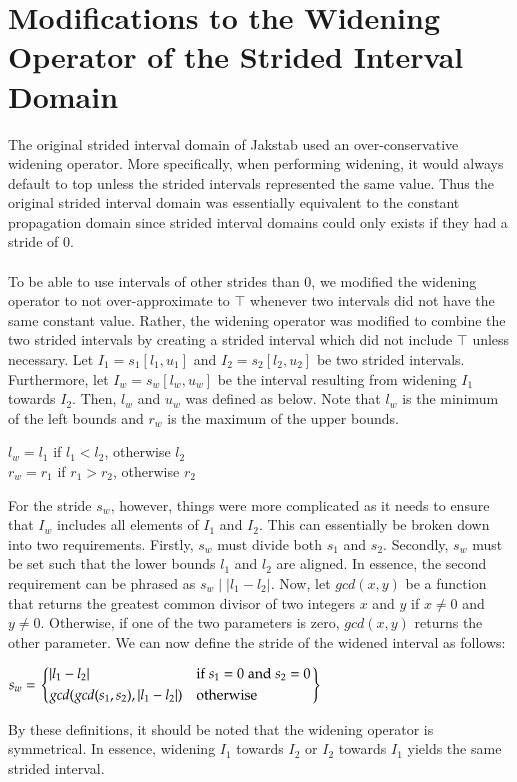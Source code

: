 \documentclass{kththesis}
\begin{document}
\section{Modifications to the Widening Operator of the Strided Interval Domain}
The original strided interval domain of Jakstab used an over-conservative widening operator. More specifically, when performing widening, it would always default to top unless the strided intervals represented the same value. Thus the original strided interval domain was essentially equivalent to the constant propagation domain since strided interval domains could only exists if they had a stride of $0$.
\\ \\
To be able to use intervals of other strides than $0$, we modified the widening operator to not over-approximate to $\top$ whenever two intervals did not have the same constant value. Rather, the widening operator was modified to combine the two strided intervals by creating a strided interval which did not include $\top$ unless necessary. Let $I_1=s_1[l_1,u_1]$ and $I_2=s_2[l_2,u_2]$ be two strided intervals. Furthermore, let $I_w=s_w[l_w,u_w]$ be the interval resulting from widening $I_1$ towards $I_2$. Then, $l_w$ and $u_w$ was defined as below. Note that $l_w$ is the minimum of the left bounds and $r_w$ is the maximum of the upper bounds.
\begin{center}
$l_w = l_1$ if $l_1 < l_2$, otherwise $l_2$\\
$r_w = r_1$ if $r_1 > r_2$, otherwise $r_2$
\end{center}
For the stride $s_w$, however, things were more complicated as it needs to ensure that $I_w$ includes all elements of $I_1$ and $I_2$. This can essentially be broken down into two requirements. Firstly, $s_w$ must divide both $s_1$ and $s_2$. Secondly, $s_w$ must be set such that the lower bounds $l_1$ and $l_2$ are aligned. In essence, the second requirement can be phrased as $s_w \mid \lvert l_1-l_2 \rvert$. Now, let $gcd(x,y)$ be a function that returns the greatest common divisor of two integers $x$ and $y$ if $x\neq0$ and $y\neq0$. Otherwise, if one of the two parameters is zero, $gcd(x,y)$ returns the other parameter. We can now define the stride of the widened interval as follows:
\begin{center}
 $s_w = 
\begin{rcases}
    \begin{dcases}
        \lvert l_1-l_2 \rvert & \text{if}\;s_1 = 0\; \text{and} \; s_2 = 0\\
        gcd(gcd(s_1,s_2),\lvert l_1-l_2 \rvert) & \text{otherwise}
    \end{dcases}
\end{rcases}
$
\end{center}
By these definitions, it should be noted that the widening operator is symmetrical. In essence, widening $I_1$ towards $I_2$ or $I_2$ towards $I_1$ yields the same strided interval.
\end{document}
